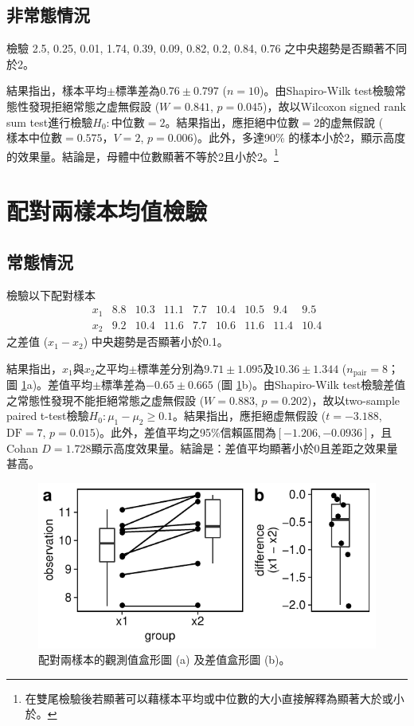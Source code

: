 \documentclass[12pt, a4paper, onecolumn]{article}
\begin{document}
\subsection{非常態情況}
檢驗 2.5, 0.25, 0.01, 1.74, 0.39, 0.09, 0.82, 0.2, 0.84, 0.76 之中央趨勢是否顯著不同於2。

結果指出，樣本平均$\pm$標準差為$0.76 \pm 0.797$ ($n = 10$)。由Shapiro-Wilk test檢驗常態性發現拒絕常態之虚無假設 ($W = 0.841$, $p = 0.045$)，故以Wilcoxon signed rank sum test進行檢驗$H_0: \text{中位數}=2$。結果指出，應拒絕中位數$=2$的虚無假說 ($\text{樣本中位數}=0.575$，$V = 2$, $p = 0.006$)。此外，多達90\% 的樣本小於2，顯示高度的效果量。結論是，母體中位數顯著不等於2且小於2。\footnote{在雙尾檢驗後若顯著可以藉樣本平均或中位數的大小直接解釋為顯著大於或小於。}

\section{配對兩樣本均值檢驗}
\subsection{常態情況}
檢驗以下配對樣本
\[
\begin{matrix}
x_1 & 8.8 & 10.3 & 11.1 & 7.7 & 10.4 & 10.5 & 9.4 & 9.5 \\
x_2 & 9.2 & 10.4 & 11.6 & 7.7 & 10.6 & 11.6 & 11.4 & 10.4
\end{matrix}
\]
之差值 ($x_1 - x_2$) 中央趨勢是否顯著小於0.1。

結果指出，$x_1$與$x_2$之平均$\pm$標準差分別為$9.71 \pm 1.095$及$10.36 \pm 1.344$ ($n_\mathrm{pair} = 8$； 圖 \ref{fig:normal_paired_test}a)。差值平均$\pm$標準差為$-0.65\pm0.665$  (圖 \ref{fig:normal_paired_test}b)。由Shapiro-Wilk test檢驗差值之常態性發現不能拒絕常態之虚無假設 ($W = 0.883$, $p = 0.202$)，故以two-sample paired t-test檢驗$H_0: \mu_1 - \mu_2 \geq 0.1$。結果指出，應拒絕虚無假設 ($t = -3.188$, $\text{DF} = 7$, $p = 0.015$)。此外，差值平均之95\%信賴區間為$\left[-1.206, -0.0936\right]$，且Cohan $D = 1.728$顯示高度效果量。結論是：差值平均顯著小於0且差距之效果量甚高。

\begin{figure}
	\centering
	\includegraphics[]{normal_paired_test.pdf}
	\caption{配對兩樣本的觀測值盒形圖 (a) 及差值盒形圖 (b)。}
	\label{fig:normal_paired_test}
\end{figure}
\end{document}
